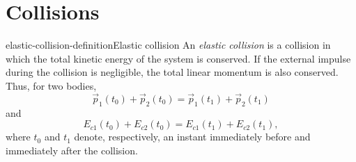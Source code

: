 \documentclass[preview]{standalone}
\begin{document}
\genpage

\section{Collisions}

\begin{snippetdefinition}{elastic-collision-definition}{Elastic collision}
    An \emph{elastic collision} is a collision in which the total kinetic energy of the system
    is conserved. If the external impulse during the collision is negligible, the total linear
    momentum is also conserved. Thus, for two bodies,
    \[
        \vec{p}_1(t_0) + \vec{p}_2(t_0)
        =
        \vec{p}_1(t_1) + \vec{p}_2(t_1)
    \]
    and
    \[
        E_{c1}(t_0) + E_{c2}(t_0)
        =
        E_{c1}(t_1) + E_{c2}(t_1),
    \]
    where \(t_0\) and \(t_1\) denote, respectively, an instant immediately before and immediately
    after the collision.
\end{snippetdefinition}
\end{document}
